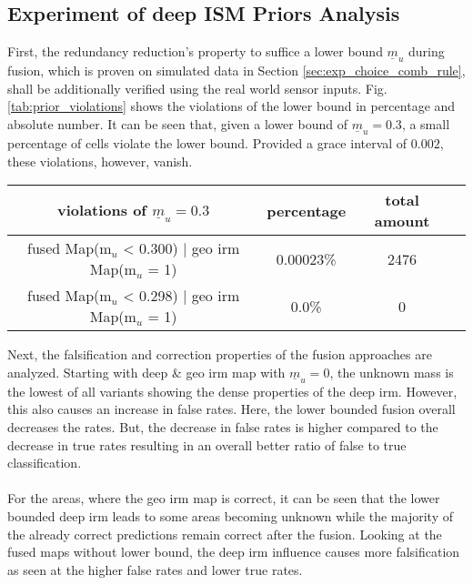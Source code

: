 \subsection{Experiment of deep ISM Priors Analysis}
\label{subsec:exp_of_prior_analy}
First, the redundancy reduction's property to suffice a lower bound $\underline{m}_u$ during fusion, which is proven on simulated data in Section \ref{sec:exp_choice_comb_rule}, shall be additionally verified using the real world sensor inputs. Fig. \ref{tab:prior_violations} shows the violations of the lower bound in percentage and absolute number. It can be seen that, given a lower bound of $\underline{m}_u = 0.3$, a small percentage of cells violate the lower bound. Provided a grace interval of $0.002$, these violations, however, vanish.
\begin{center}
	\begin{tabular}{c|ccc}
		violations of $\underline{m}_u=0.3$ & percentage & total amount \\
		\hline
		fused Map(m$_u$ < 0.300) | geo \gls{irm} Map(m$_u$ = 1) & 0.00023\% & 2476\\
		fused Map(m$_u$ < 0.298) | geo \gls{irm} Map(m$_u$ = 1) & 0.0\% & 0
	\end{tabular}
\end{center} 
Next, the falsification and correction properties of the fusion approaches are analyzed. Starting with deep \& geo \gls{irm} map with $\underline{m}_u=0$, the unknown mass is the lowest of all variants showing the dense properties of the deep \gls{irm}. However, this also causes an increase in false rates. Here, the lower bounded fusion overall decreases the rates. But, the decrease in false rates is higher compared to the decrease in true rates resulting in an overall better ratio of false to true classification. 
\\\\
For the areas, where the geo \gls{irm} map is correct, it can be seen that the lower bounded deep \gls{irm} leads to some areas becoming unknown while the majority of the already correct predictions remain correct after the fusion. Looking at the fused maps without lower bound, the deep \gls{irm} influence causes more falsification as seen at the higher false rates and lower true rates.
